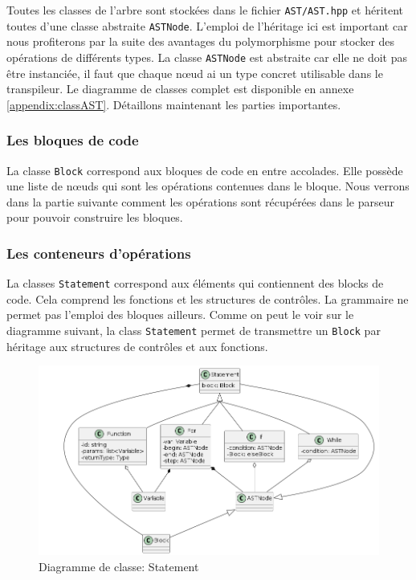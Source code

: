 \documentclass[a4paper]{article}%
\begin{document}
Toutes les classes de l'arbre sont stockées dans le fichier
\lstinline{AST/AST.hpp} et héritent toutes d'une classe abstraite
\lstinline{ASTNode}. L'emploi de l'héritage ici est important car
nous profiterons par la suite des avantages du polymorphisme pour stocker des
opérations de différents types. La classe \lstinline{ASTNode} est abstraite car
elle ne doit pas être instanciée, il faut que chaque nœud ai un type concret
utilisable dans le transpileur. Le diagramme de classes complet est disponible
en annexe \ref{appendix:classAST}. Détaillons maintenant les parties
importantes.

\subsubsection*{Les bloques de code}

La classe \lstinline{Block} correspond aux bloques de code en entre accolades.
Elle possède une liste de nœuds qui sont les opérations contenues dans le
bloque. Nous verrons dans la partie suivante comment les opérations sont
récupérées dans le parseur pour pouvoir construire les bloques.

\clearpage{}
\subsubsection*{Les conteneurs d'opérations}

La classes \lstinline{Statement} correspond aux éléments qui contiennent des
blocks de code. Cela comprend les fonctions et les structures de contrôles. La
grammaire ne permet pas l'emploi des bloques ailleurs. Comme on peut le voir sur
le diagramme suivant, la class \lstinline{Statement} permet de transmettre un
\lstinline{Block} par héritage aux structures de contrôles et aux fonctions.

\begin{figure}[h!]
  \begin{center}
  \includegraphics[scale=0.5]{../ressources/diagrams/stmts.png}
  \caption{Diagramme de classe: Statement}
  \end{center}
\end{figure}
\end{document}
